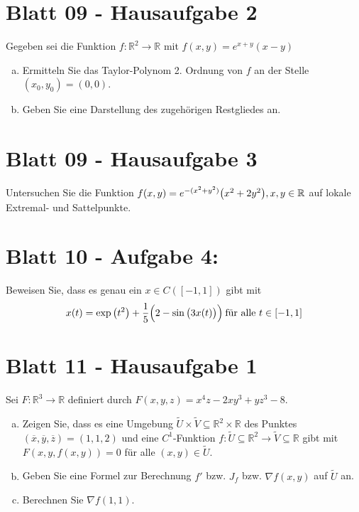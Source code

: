 \documentclass{scrreprt}
\begin{document}
\section{Blatt 09 - Hausaufgabe 2}

Gegeben sei die Funktion
$f \colon \mathbb{R}^2 \to \mathbb{R}$ mit
$f(x, y) = e^{x + y}(x - y)$
\begin{enumerate}[a)]
\item Ermitteln Sie das Taylor-Polynom 2. Ordnung von $f$ an der Stelle
  $(x_0, y_0) = (0, 0)$.
\item Geben Sie eine Darstellung des zugehörigen Restgliedes an.
\end{enumerate}

\section{Blatt 09 - Hausaufgabe 3}

Untersuchen Sie die Funktion
$f(x, y) = e^{-(x^2 + y^2)}\qty(x^2 + 2y^2), x, y \in \mathbb{R}$ auf lokale
Extremal- und Sattelpunkte.

\section{Blatt 10 - Aufgabe 4:}
Beweisen Sie, dass es genau ein $x \in C([-1, 1])$ gibt
mit
\[
  x(t) = \exp\qty(t^2) + \frac{1}{5}\qty\Big(2 - \sin\qty\big(3x(t))) \: \text{für alle } t \in [-1, 1]
\]

\section{Blatt 11 - Hausaufgabe 1}

Sei $F \colon \mathbb{R}^3 \to \mathbb{R}$
definiert durch $F(x, y, z) = x^4z - 2xy^3 + yz^3 - 8$.
\begin{enumerate}[a)]
\item Zeigen Sie, dass es eine Umgebung
  $\tilde{U} \times \tilde{V} \subseteq \mathbb{R}^2 \times \mathbb{R}$
  des Punktes $(\overline{x}, \overline{y}, \overline{z}) = (1, 1, 2)$
  und eine $C^1$-Funktion
  $f \colon \tilde{U} \subseteq \mathbb{R}^2 \to \tilde{V} \subseteq \mathbb{R}$
  gibt mit $F(x, y, f(x, y)) = 0$ für alle $(x, y) \in \tilde{U}$.
\item Geben Sie eine Formel zur Berechnung $f'$ bzw. $J_f$ bzw.
  $\nabla f(x, y)$ auf $\tilde{U}$ an.
\item Berechnen Sie $\nabla f(1, 1)$.
\end{enumerate}
\end{document}
